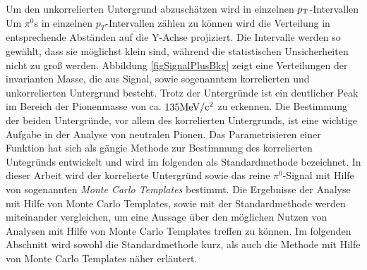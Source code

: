 \newline
Um den unkorrelierten Untergrund abzusch\"atzen wird in einzelnen $p_{\rm{T}}$-Intervallen 
Um $\pi^{0}$s in einzelnen $p_{T}$-Intervallen z{\"a}hlen zu k{\"o}nnen wird die Verteilung in entsprechende Abst{\"a}nden auf die Y-Achse projiziert.
Die Intervalle werden so gew{\"a}hlt, dass sie m{\"o}glichst klein sind, w{\"a}hrend die statistischen Unsicherheiten nicht zu gro{\ss} werden.
Abbildung \ref{figSignalPlusBkg} zeigt eine Verteilungen der invarianten Masse, die aus Signal, sowie sogenanntem korrelierten und unkorrelierten Untergrund besteht.
Trotz der Untergr\"unde ist ein deutlicher Peak im Bereich der Pionenmasse von ca. $135\rm{MeV}/c^{2}$ zu erkennen.
Die Bestimmung der beiden Untergr\"unde, vor allem des korrelierten Untergrunds, ist eine wichtige Aufgabe in der Analyse von neutralen Pionen.
Das Parametrisieren einer Funktion hat sich als g\"angie Methode zur Bestimmung des korrelierten Untegr\"unds entwickelt und wird im folgenden als Standardmethode bezeichnet.
In dieser Arbeit wird der korrelierte Untergr\"und sowie das reine $\pi^{0}$-Signal mit Hilfe von sogenannten \textit{Monte Carlo Templates} bestimmt.
Die Ergebnisse der Analyse mit Hilfe von Monte Carlo Templates, sowie mit der Standardmethode werden miteinander vergleichen, um eine Aussage \"uber den m\"oglichen Nutzen von Analysen mit Hilfe von Monte Carlo Templates treffen zu k\"onnen.
Im folgenden Abschnitt wird sowohl die Standardmethode kurz, als auch die Methode mit Hilfe von Monte Carlo Templates n\"aher erl\"autert.
